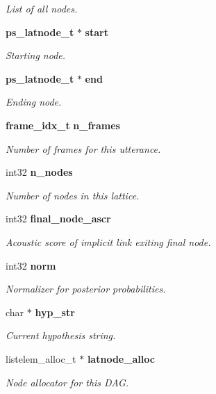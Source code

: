 \begin{DoxyCompactItemize}
\begin{DoxyCompactList}\small\item\em List of all nodes. \end{DoxyCompactList}\item 
\textbf{ ps\+\_\+latnode\+\_\+t} $\ast$ \textbf{ start}
\begin{DoxyCompactList}\small\item\em Starting node. \end{DoxyCompactList}\item 
\textbf{ ps\+\_\+latnode\+\_\+t} $\ast$ \textbf{ end}
\begin{DoxyCompactList}\small\item\em Ending node. \end{DoxyCompactList}\item 
\textbf{ frame\+\_\+idx\+\_\+t} \textbf{ n\+\_\+frames}
\begin{DoxyCompactList}\small\item\em Number of frames for this utterance. \end{DoxyCompactList}\item 
int32 \textbf{ n\+\_\+nodes}
\begin{DoxyCompactList}\small\item\em Number of nodes in this lattice. \end{DoxyCompactList}\item 
int32 \textbf{ final\+\_\+node\+\_\+ascr}
\begin{DoxyCompactList}\small\item\em Acoustic score of implicit link exiting final node. \end{DoxyCompactList}\item 
int32 \textbf{ norm}
\begin{DoxyCompactList}\small\item\em Normalizer for posterior probabilities. \end{DoxyCompactList}\item 
char $\ast$ \textbf{ hyp\+\_\+str}
\begin{DoxyCompactList}\small\item\em Current hypothesis string. \end{DoxyCompactList}\item 
listelem\+\_\+alloc\+\_\+t $\ast$ \textbf{ latnode\+\_\+alloc}
\begin{DoxyCompactList}\small\item\em Node allocator for this D\+AG. \end{DoxyCompactList}\item 

\end{DoxyCompactItemize}
